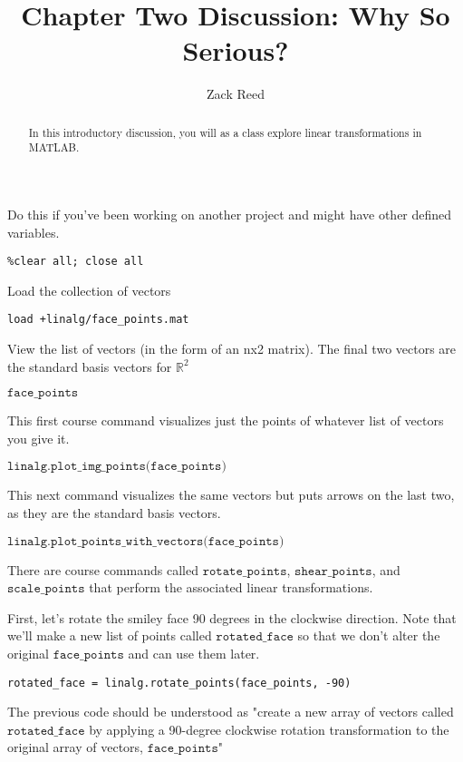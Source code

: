 \documentclass{ximera}
\author{Zack Reed}
\title{Chapter Two Discussion: Why So Serious?}
\begin{document}
\begin{abstract}

    In this introductory discussion, you will as a class explore linear transformations in MATLAB.

\end{abstract}
\maketitle

\begin{exploration}

Do this if you've been working on another project and might have other defined variables.
\begin{verbatim}
%clear all; close all
\end{verbatim}

Load the collection of vectors
\begin{verbatim}load +linalg/face_points.mat\end{verbatim}

View the list of vectors (in the form of an nx2 matrix). The final two vectors are the standard basis vectors for \(\mathbb{R}^2\)

$\texttt{face\_points}$

This first course command visualizes just the points of whatever list of vectors you give it.

$\texttt{linalg.plot\_img\_points(face\_points)}$

This next command visualizes the same vectors but puts arrows on the last two, as they are the standard basis vectors.

$\texttt{linalg.plot\_points\_with\_vectors(face\_points)}$

There are course commands called $\texttt{rotate\_points}$, $\texttt{shear\_points}$, and $\texttt{scale\_points}$ that perform the associated linear transformations.

First, let's rotate the smiley face 90 degrees in the clockwise direction. Note that we'll make a new list of points called $\texttt{rotated\_face}$ so that we don't alter the original $\texttt{face\_points}$ and can use them later.
\begin{verbatim}
rotated_face = linalg.rotate_points(face_points, -90)
\end{verbatim}

The previous code should be understood as "create a new array of vectors called $\texttt{rotated\_face}$ by applying a 90-degree clockwise rotation transformation to the original array of vectors, $\texttt{face\_points}$"


\end{exploration}
\end{document}
